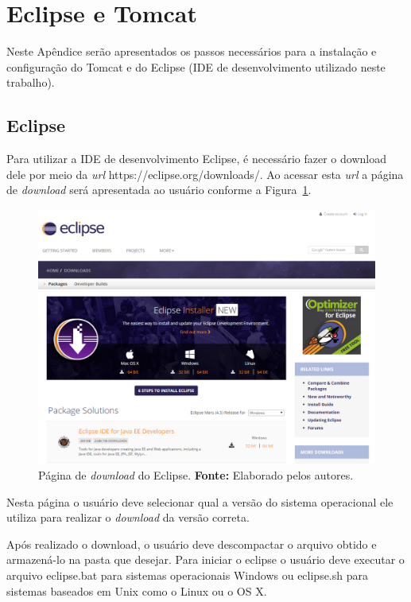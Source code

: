 \chapter*{Eclipse e Tomcat}
\label{apendice:eclipse_tomcat}

Neste Apêndice serão apresentados os passos necessários para a instalação e configuração do Tomcat e do Eclipse (IDE de desenvolvimento utilizado neste trabalho).

\section*{Eclipse}

Para utilizar a IDE de desenvolvimento Eclipse, é necessário fazer o download dele por meio da \textit{url} https://eclipse.org/downloads/. Ao acessar esta \textit{url} a página de \textit{download} será apresentada ao usuário conforme a Figura~\ref{fig:ap2:pagina_download_eclipse}.

\captionsetup[figure]{list=no}
\begin{figure}[h!]
	\centerline{\includegraphics[scale=0.4]{./imagens/apendices/pagina-download-eclipse.png}}
	\caption[Página de \textit{download} do Eclipse.]
	{Página de \textit{download} do Eclipse. \textbf{Fonte:} Elaborado pelos autores.}
	\label{fig:ap2:pagina_download_eclipse}
\end{figure}

Nesta página o usuário deve selecionar qual a versão do sistema operacional ele utiliza para realizar o \textit{download} da versão correta.

Após realizado o download, o usuário deve descompactar o arquivo obtido e armazená-lo na pasta que desejar. Para iniciar o eclipse o usuário deve executar o arquivo eclipse.bat para sistemas operacionais Windows ou eclipse.sh para sistemas baseados em Unix como o Linux ou o OS X.

